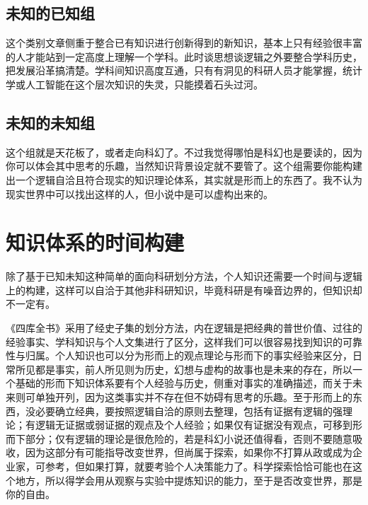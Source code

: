 \documentclass[]{tufte-book}
\begin{document}
\hypertarget{ux672aux77e5ux7684ux5df2ux77e5ux7ec4}{%
\subsection{未知的已知组}\label{ux672aux77e5ux7684ux5df2ux77e5ux7ec4}}

这个类别文章侧重于整合已有知识进行创新得到的新知识，基本上只有经验很丰富的人才能站到一定高度上理解一个学科。此时谈思想谈逻辑之外要整合学科历史，把发展沿革搞清楚。学科间知识高度互通，只有有洞见的科研人员才能掌握，统计学或人工智能在这个层次知识的失灵，只能摸着石头过河。

\hypertarget{ux672aux77e5ux7684ux672aux77e5ux7ec4}{%
\subsection{未知的未知组}\label{ux672aux77e5ux7684ux672aux77e5ux7ec4}}

这个组就是天花板了，或者走向科幻了。不过我觉得哪怕是科幻也是要读的，因为你可以体会其中思考的乐趣，当然知识背景设定就不要管了。这个组需要你能构建出一个逻辑自洽且符合现实的知识理论体系，其实就是形而上的东西了。我不认为现实世界中可以找出这样的人，但小说中是可以虚构出来的。

\hypertarget{ux77e5ux8bc6ux4f53ux7cfbux7684ux65f6ux95f4ux6784ux5efa}{%
\section{知识体系的时间构建}\label{ux77e5ux8bc6ux4f53ux7cfbux7684ux65f6ux95f4ux6784ux5efa}}

除了基于已知未知这种简单的面向科研划分方法，个人知识还需要一个时间与逻辑上的构建，这样可以自洽于其他非科研知识，毕竟科研是有噪音边界的，但知识却不一定有。

《四库全书》采用了经史子集的划分方法，内在逻辑是把经典的普世价值、过往的经验事实、学科知识与个人文集进行了区分，这样我们可以很容易找到知识的可靠性与归属。个人知识也可以分为形而上的观点理论与形而下的事实经验来区分，日常所见都是事实，前人所见则为历史，幻想与虚构的故事也是未来的存在，所以一个基础的形而下知识体系要有个人经验与历史，侧重对事实的准确描述，而关于未来则可单独开列，因为这类事实并不存在但不妨碍有思考的乐趣。至于形而上的东西，没必要确立经典，要按照逻辑自洽的原则去整理，包括有证据有逻辑的强理论；有逻辑无证据或弱证据的观点及个人经验；如果仅有证据没有观点，可移到形而下部分；仅有逻辑的理论是很危险的，若是科幻小说还值得看，否则不要随意吸收，因为这部分有可能指导改变世界，但尚属于探索，如果你不打算从政或成为企业家，可参考，但如果打算，就要考验个人决策能力了。科学探索恰恰可能也在这个地方，所以得学会用从观察与实验中提炼知识的能力，至于是否改变世界，那是你的自由。
\end{document}
